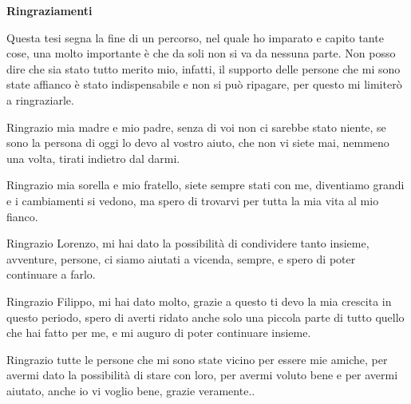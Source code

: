 \noindent \textbf{Ringraziamenti}

\vspace{0.3cm}

\noindent Questa tesi segna la fine di un percorso, nel quale ho imparato e capito tante cose, una molto importante è che da soli non si va da nessuna parte. 
Non posso dire che sia stato tutto merito mio, infatti, il supporto delle persone che mi sono state affianco è stato indispensabile e non si può ripagare, per questo mi limiterò a ringraziarle.

\noindent Ringrazio mia madre e mio padre, senza di voi non ci sarebbe stato niente, se sono la persona di oggi lo devo al vostro aiuto, che non vi siete mai, nemmeno una volta, tirati indietro dal darmi.

\noindent Ringrazio mia sorella e mio fratello, siete sempre stati con me, diventiamo grandi e i cambiamenti si vedono, ma spero di trovarvi per tutta la mia vita al mio fianco.

\noindent Ringrazio Lorenzo, mi hai dato la possibilità di condividere tanto insieme, avventure, persone, ci siamo aiutati a vicenda, sempre, e spero di poter continuare a farlo. 

\noindent Ringrazio Filippo, mi hai dato molto, grazie a questo ti devo la mia crescita in questo periodo, spero di averti ridato anche solo una piccola parte di tutto quello che hai fatto per me, e mi auguro di poter continuare insieme.

\noindent Ringrazio tutte le persone che mi sono state vicino per essere mie amiche, per avermi dato la possibilità di stare con loro, per avermi voluto bene e per avermi aiutato, anche io vi voglio bene, grazie veramente..